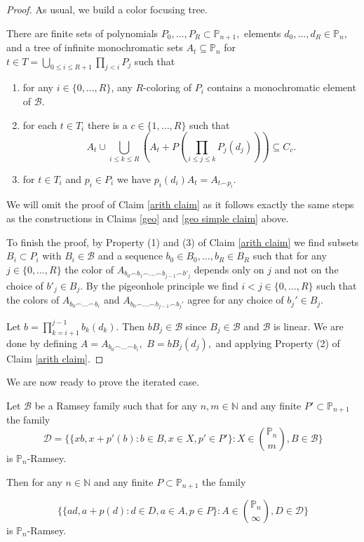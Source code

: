 \documentclass[tocmacros]{daj}
\begin{document}
\begin{proof}
As usual, we build a color focusing tree.

\begin{claim}\label{arith claim}
There are finite sets of polynomials $P_0,...,P_R\subset \mathbb{P}_{n+1},$ elements $d_0,...,d_R\in \mathbb{P}_n,$ and a tree of infinite monochromatic sets $A_t\subseteq \mathbb{P}_n$ for $t\in T=\bigcup_{0\leq i\leq R+1}\prod_{j<i}P_{j}$ such that

\begin{enumerate}
    \item for any $i\in \{0,...,R\}$, any $R$-coloring of ${P}_i$ contains a monochromatic element of $\mathcal{B}.$
    \item  for each $t\in T_i$ there is a $c\in \{1,...,R\}$ such that $$A_t\cup\bigcup_{i\leq k\leq R}(A_t+P(\prod_{i\leq j\leq k}P_j(d_j)))\subseteq C_c.$$
    \item for $t\in T_i$ and $p_i\in P_i$ we have $p_i(d_i)A_t=A_{t\smallfrown p_i}.$
\end{enumerate}
\end{claim}

We will omit the proof of Claim \ref{arith claim} as it follows exactly the same steps as the constructions in Claims \ref{geo} and \ref{geo simple claim} above.

To finish the proof, by Property (1) and (3) of Claim \ref{arith claim} we find subsets $B_i\subset P_i$ with $B_i\in \mathcal{B}$ and a sequence $b_0\in B_0,\ldots,b_R\in B_R$ such that for any $j\in \{0,\ldots, R\}$ the color of $A_{b_{0}\smallfrown b_1\smallfrown\ldots\smallfrown b_{j-1}\smallfrown b'_j}$ depends only on $j$ and not on the choice of $b'_j\in B_j$.  By the pigeonhole principle we find $i<j\in \{0,\ldots,R\}$ such that the colors of $A_{b_{0}\smallfrown...\smallfrown b_{i}}$ and $A_{b_{0}\smallfrown ...\smallfrown b_{j-1}\smallfrown b_{j}'}$ agree for any choice of $b_{j}'\in B_j$.


Let $b=\prod_{k=i+1}^{j-1}b_{k}(d_k).$  Then $bB_j\in \mathcal{B}$ since $B_j\in\mathcal{B}$ and $\mathcal{B}$ is linear. We are done by defining $A=A_{b_{0}\smallfrown...\smallfrown b_{i}},$ $B=bB_{j}(d_j),$ and applying Property (2) of Claim \ref{arith claim}. 

\end{proof}

We are now ready to prove the iterated case.

\begin{proposition}\label{prop iterated full}
Let $\mathcal{B}$ be a Ramsey family such that for any $n,m\in\mathbb{N}$ and any finite $P'\subset \mathbb{P}_{n+1}$ the family $$\mathcal{D}=\{\{xb, x+p'(b):b\in B, x\in X, p'\in P'\}: X\in \binom{\mathbb{P}_n}{m},B\in\mathcal{B}\}$$ is $\mathbb{P}_n$-Ramsey.

Then for any $n\in\mathbb{N}$ and any finite $P\subset \mathbb{P}_{n+1}$ the family 

$$\{\{ad, a+p(d):d\in D, a\in A, p\in P\}: A\in \binom{\mathbb{P}_n}{\infty},D\in\mathcal{D}\}$$ is $\mathbb{P}_n$-Ramsey.
\end{proposition}
\end{document}
